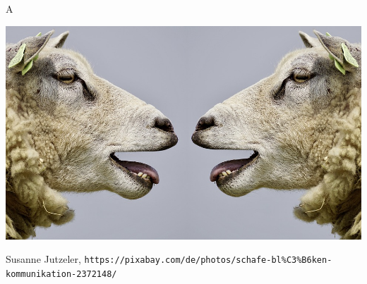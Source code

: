 \documentclass[../main.tex]{subfiles}
\begin{document}
A
\begin{center}
\includegraphics[width=\textwidth]{sheep-2372148_960_720.jpg}

Susanne Jutzeler, \texttt{https://pixabay.com/de/photos/schafe-bl\%C3\%B6ken-kommunikation-2372148/}
\end{center}


\end{document}
